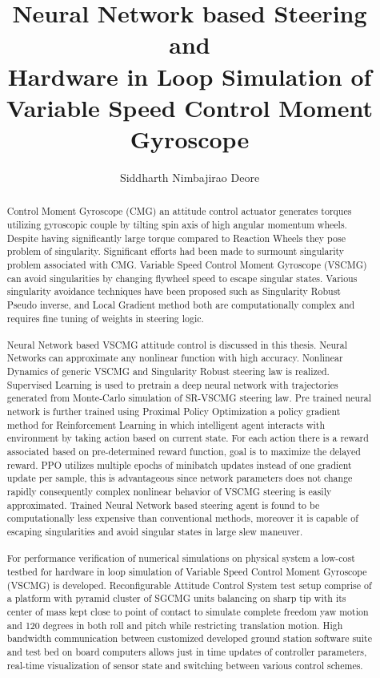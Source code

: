 \documentclass[english,oneside,LaM,binding=0.0cm]{sapthesis}
\title{Neural Network based Steering and \\ Hardware in Loop Simulation of Variable Speed Control Moment Gyroscope}
\author{Siddharth Nimbajirao Deore}
\begin{document}
\frontmatter
\maketitle
\dedication{Dedicated to\\ Aai and Aaba}

\begin{abstract}
{}
Control Moment Gyroscope (CMG) an attitude control actuator generates torques utilizing gyroscopic couple by tilting spin axis of high angular momentum wheels. Despite having significantly large torque compared to Reaction Wheels they pose problem of singularity. Significant efforts had been made to surmount singularity problem associated with CMG. Variable Speed Control Moment Gyroscope (VSCMG) can avoid singularities by changing flywheel speed to escape singular states. Various singularity avoidance techniques have been proposed such as Singularity Robust Pseudo inverse, and Local Gradient method both are computationally complex and requires fine tuning of weights in steering logic. \\
\\
Neural Network based VSCMG attitude control is discussed in this thesis. Neural Networks can approximate any nonlinear function with high accuracy. Nonlinear Dynamics of generic VSCMG and Singularity Robust steering law is realized. Supervised Learning is used to pretrain a deep neural network with trajectories generated from Monte-Carlo simulation of SR-VSCMG steering law. Pre trained neural network is further trained using Proximal Policy Optimization a policy gradient method for Reinforcement Learning in which intelligent agent interacts with environment by taking action based on current state. For each action there is a reward associated based on pre-determined reward function, goal is to maximize the delayed reward. PPO utilizes multiple epochs of minibatch updates instead of one gradient update per sample, this is advantageous since network parameters does not change rapidly consequently complex nonlinear behavior of VSCMG steering is easily approximated. Trained Neural Network based steering agent is found to be computationally less expensive than conventional methods, moreover it is capable of escaping singularities and avoid singular states in large slew maneuver.  \\
\\
For performance verification of numerical simulations on physical system a low-cost testbed for hardware in loop simulation of Variable Speed Control Moment Gyroscope (VSCMG) is developed. Reconfigurable Attitude Control System test setup comprise of a platform with pyramid cluster of SGCMG units balancing on sharp tip with its center of mass kept close to point of contact to simulate complete freedom yaw motion and 120 degrees in both roll and pitch while restricting translation motion. High bandwidth communication between customized developed ground station software suite and test bed on board computers allows just in time updates of controller parameters, real-time visualization of sensor state and switching between various control schemes.


\end{abstract}
\end{document}

